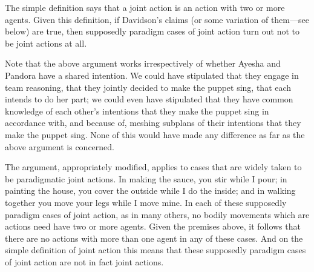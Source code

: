 \documentclass[12pt,a4paper]{extarticle}
\begin{document}
The simple definition says that a joint action is an action with two or more agents.  Given this definition, if Davidson's claims (or some variation of them---see below) are true, then supposedly paradigm cases of joint action turn out not to be joint actions at all.

Note that the above argument works irrespectively of whether Ayesha and Pandora have a shared intention.
We could have stipulated that they engage in team reasoning, that they jointly decided to make the puppet sing, that each intends to do her part; we could even have stipulated that they have common knowledge of each other's intentions that they make the puppet sing in accordance with, and because of, meshing subplans of their  intentions that they make the puppet sing.
None of this would have made  any difference as far as the above argument is concerned.

The argument, appropriately modified, applies to cases that are widely taken to be paradigmatic joint actions.
In making the sauce, you stir while I pour;
in painting the house, you cover the outside while I do the inside; 
and in walking together you move your legs while I move mine.
In each of these supposedly paradigm cases of joint action, as in many others, no bodily movements which are actions need have two or more agents.
Given the premises above, it follows that there are no actions with more than one agent in any of these cases.
And on the simple definition of joint action this means that these supposedly paradigm cases of joint action are not in fact joint actions.
\end{document}
